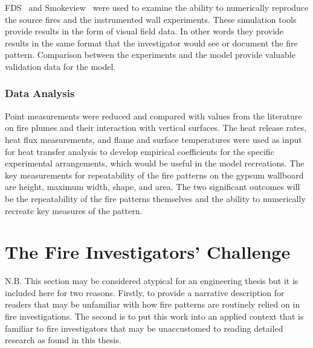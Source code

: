 \documentclass[twoside]{uocthesis}
\begin{document}
{FDS~\cite{FDS_Users_Guide} and Smokeview~\cite{Smokeview_Users_Guide} were used to examine the ability to numerically reproduce the source fires and the instrumented wall experiments. These simulation tools provide results in the form of visual field data.  In other words they provide results in the same format that the investigator would see or document the fire pattern.  Comparison between the experiments and the model provide valuable validation data for the model.

\subsubsection{Data Analysis}

Point measurements were reduced and compared with values from the literature on fire plumes and their interaction with vertical surfaces.  The heat release rates, heat flux measurements, and flame and surface temperatures were used as input for heat transfer analysis to develop empirical coefficients for the specific experimental arrangements, which would be useful in the model recreations.
The key measurements for repeatability of the fire patterns on the gypsum wallboard are height, maximum width, shape, and area.  The two significant outcomes will be the repeatability of the fire patterns themselves and the ability to numerically recreate key measures of the pattern.

\section{The Fire Investigators' Challenge}

N.B. This section may be considered atypical for an engineering thesis but it is included here for two reasons.  Firstly, to provide a narrative description for readers that may be unfamiliar with how fire patterns are routinely relied on in fire investigations.  The second is to put this work into an applied context that is familiar to fire investigators that may be unaccustomed to reading detailed research as found in this thesis.  

}
\end{document}
